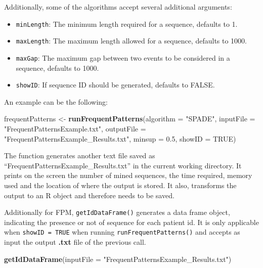 \documentclass[
]{article}
\newenvironment{Shaded}{\begin{snugshade}}{\end{snugshade}}
\newcommand{\DataTypeTok}[1]{\textcolor[rgb]{0.13,0.29,0.53}{#1}}
\newcommand{\FloatTok}[1]{\textcolor[rgb]{0.00,0.00,0.81}{#1}}
\newcommand{\KeywordTok}[1]{\textcolor[rgb]{0.13,0.29,0.53}{\textbf{#1}}}
\newcommand{\NormalTok}[1]{#1}
\newcommand{\OtherTok}[1]{\textcolor[rgb]{0.56,0.35,0.01}{#1}}
\newcommand{\StringTok}[1]{\textcolor[rgb]{0.31,0.60,0.02}{#1}}
\providecommand{\tightlist}{%
  \setlength{\itemsep}{0pt}\setlength{\parskip}{0pt}}
\begin{document}
Additionally, some of the algorithms accept several additional
arguments:

\begin{itemize}
\tightlist
\item
  \texttt{minLength}: The minimum length required for a sequence,
  defaults to 1.\\
\item
  \texttt{maxLength}: The maximum length allowed for a sequence,
  defaults to 1000.\\
\item
  \texttt{maxGap}: The maximum gap between two events to be considered
  in a sequence, defaults to 1000.\\
\item
  \texttt{showID}: If sequence ID should be generated, defaults to
  FALSE.
\end{itemize}

An example can be the following:

\begin{Shaded}
\begin{Highlighting}[]
\NormalTok{frequentPatterns <-}\StringTok{ }\KeywordTok{runFrequentPatterns}\NormalTok{(}\DataTypeTok{algorithm =} \StringTok{"SPADE"}\NormalTok{, }
                                        \DataTypeTok{inputFile =} \StringTok{"FrequentPatternsExample.txt"}\NormalTok{, }
                                        \DataTypeTok{outputFile =} \StringTok{"FrequentPatternsExample_Results.txt"}\NormalTok{, }
                                        \DataTypeTok{minsup =} \FloatTok{0.5}\NormalTok{, }
                                        \DataTypeTok{showID =} \OtherTok{TRUE}\NormalTok{)}
\end{Highlighting}
\end{Shaded}

The function generates another text file saved as
``FrequentPatternsExample\_Results.txt'' in the current working
directory. It prints on the screen the number of mined sequences, the
time required, memory used and the location of where the output is
stored. It also, transforms the output to an R object and therefore
needs to be saved.

Additionally for FPM, \texttt{getIdDataFrame()} generates a data frame
object, indicating the presence or not of sequence for each patient id.
It is only applicable when \texttt{showID\ =\ TRUE} when running
\texttt{runFrequentPatterns()} and accepts as input the output
\textbf{.txt} file of the previous call.

\begin{Shaded}
\begin{Highlighting}[]
\KeywordTok{getIdDataFrame}\NormalTok{(}\DataTypeTok{inputFile =} \StringTok{"FrequentPatternsExample_Results.txt"}\NormalTok{)}
\end{Highlighting}
\end{Shaded}
\end{document}
